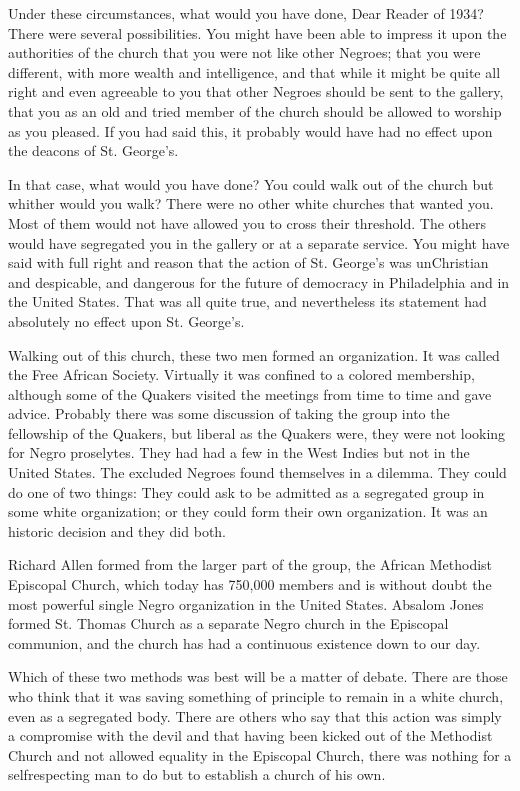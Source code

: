 \documentclass[letterpaper,10pt,english]{jupyterBook}
\begin{document}
\sphinxAtStartPar
Under these circumstances, what would you have done, Dear Reader of 1934? There were several possibilities. You might have been able to impress it upon the authorities of the church that you were not like other Negroes; that you were different, with more wealth and intelligence, and that while it might be quite all right and even agreeable to you that other Negroes should be sent to the gallery, that you as an old and tried member of the church should be allowed to worship as you pleased. If you had said this, it probably would have had no effect upon the deacons of St. George’s.

\sphinxAtStartPar
In that case, what would you have done? You could walk out of the church but whither would you walk? There were no other white churches that wanted you. Most of them would not have allowed you to cross their threshold. The others would have segregated you in the gallery or at a separate service. You might have said with full right and reason that the action of St. George’s was un\sphinxhyphen{}Christian and despicable, and dangerous for the future of democracy in Philadelphia and in the United States. That was all quite true, and nevertheless its statement had absolutely no effect upon St. George’s.

\sphinxAtStartPar
Walking out of this church, these two men formed an organization. It was called the Free African Society. Virtually it was confined to a colored membership, although some of the Quakers visited the meetings from time to time and gave advice. Probably there was some discussion of taking the group into the fellowship of the Quakers, but liberal as the Quakers were, they were not looking for Negro proselytes. They had had a few in the West Indies but not in the United States. The excluded Negroes found themselves in a dilemma. They could do one of two things: They could ask to be admitted as a segregated group in some white organization; or they could form their own organization. It was an historic decision and they did both.

\sphinxAtStartPar
Richard Allen formed from the larger part of the group, the African Methodist Episcopal Church, which today has 750,000 members and is without doubt the most powerful single Negro organization in the United States. Absalom Jones formed St. Thomas Church as a separate Negro church in the Episcopal communion, and the church has had a continuous existence down to our day.

\sphinxAtStartPar
Which of these two methods was best will be a matter of debate. There are those who think that it was saving something of principle to remain in a white church, even as a segregated body. There are others who say that this action was simply a compromise with the devil and that having been kicked out of the Methodist Church and not allowed equality in the Episcopal Church, there was nothing for a self\sphinxhyphen{}respecting man to do but to establish a church of his own.
\end{document}
